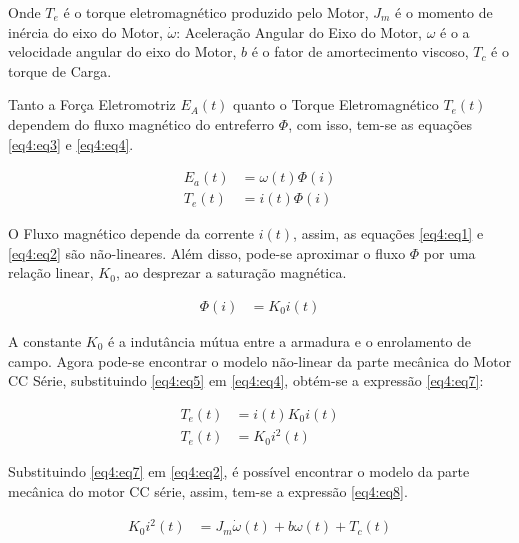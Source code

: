 Onde $T_e$ é o torque eletromagnético produzido pelo Motor, $J_m$  é o momento de inércia do eixo do Motor, $\dot{\omega}$: Aceleração Angular do Eixo do Motor, $\omega$ é o a velocidade angular do eixo do Motor, $b$  é o fator de amortecimento viscoso, $T_c$ é o torque de Carga.

Tanto a Força Eletromotriz $E_A(t)$ quanto o Torque Eletromagnético $T_e(t)$ dependem do fluxo magnético do entreferro $\Phi$, com isso, tem-se as equações \ref{eq4:eq3} e \ref{eq4:eq4}.

\begin{align}
	E_a(t) &= \omega(t) \Phi{(i)} \label{eq4:eq3}\\
	T_e(t) &= i(t) \Phi{(i)}			\label{eq4:eq4}
\end{align}

O Fluxo magnético depende da corrente $i(t)$, assim, as equações \ref{eq4:eq1} e \ref{eq4:eq2} são não-lineares. Além disso, pode-se aproximar o fluxo $\Phi$ por uma relação linear, $K_0$, ao desprezar a saturação magnética.

\begin{align}
	\Phi(i) &= K_0 i(t) \label{eq4:eq5}
\end{align}

A constante $K_0$ é a indutância mútua entre a armadura e o enrolamento de campo. Agora pode-se encontrar o modelo não-linear da parte mecânica do Motor CC Série, substituindo \ref{eq4:eq5} em \ref{eq4:eq4}, obtém-se a expressão \ref{eq4:eq7}:

\begin{align}
	T_e(t) &= i(t) K_0 i(t) \label{eq4:eq6}\\
	T_e(t) &= K_0 i^2(t) 	\label{eq4:eq7}
\end{align}

Substituindo \ref{eq4:eq7} em \ref{eq4:eq2}, é possível encontrar o modelo da parte mecânica do motor CC série, assim, tem-se a expressão  \ref{eq4:eq8}.


\begin{align}
	K_0 i^2(t) &= J_m\dot{\omega}(t) + b\omega(t) + T_c(t) \label{eq4:eq8}
\end{align}



